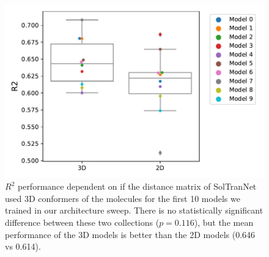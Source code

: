 \documentclass[journal=jcisd8,manuscript=article]{achemso}
\begin{document}
\begin{figure}[tb]
    \centering
    \includegraphics[width=\linewidth]{figures/2dv3d_r2.pdf}
    \caption{$R^2$ performance dependent on if the distance matrix of SolTranNet used 3D conformers of the molecules for the first 10 models we trained in our architecture sweep. There is no statistically significant difference between these two collections ($p=0.116$), but the mean performance of the 3D models is better than the 2D models (0.646 vs 0.614).}
    \label{fig:2dv3dr2}
\end{figure}
\end{document}

